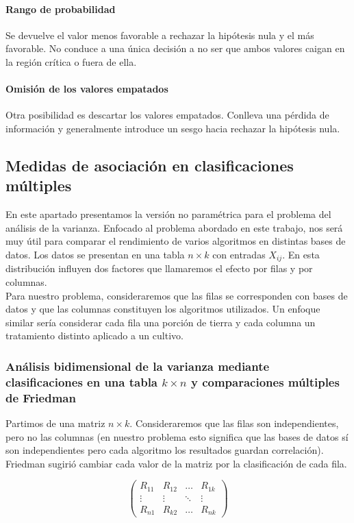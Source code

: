 \paragraph{Rango de probabilidad} Se devuelve el valor menos favorable a rechazar la hipótesis nula y el más favorable. No conduce a una única decisión a no ser que ambos valores caigan en la región crítica o fuera de ella.

\paragraph{Omisión de los valores empatados} Otra posibilidad es descartar los valores empatados. Conlleva una pérdida de información y generalmente introduce un sesgo hacia rechazar la hipótesis nula.

	
\subsection{Medidas de asociación en clasificaciones múltiples}	

	En este apartado presentamos la versión no paramétrica para el problema del análisis de la varianza. Enfocado al problema abordado en este trabajo, nos será muy útil para comparar el rendimiento de varios algoritmos en distintas bases de datos. Los datos se presentan en una tabla $n \times k$ con entradas $X_{ij}$. En esta distribución influyen dos factores que llamaremos el efecto por filas y por columnas.\\
	 Para nuestro problema, consideraremos que las filas se corresponden con bases de datos y que las columnas constituyen los algoritmos utilizados. Un enfoque similar sería considerar cada fila una porción de tierra y cada columna un tratamiento distinto aplicado a un cultivo.
	
\subsubsection{Análisis bidimensional de la varianza mediante clasificaciones en una tabla $k \times n$ y comparaciones múltiples de Friedman}

	Partimos de una matriz $n \times k$. Consideraremos que las filas son independientes, pero no las columnas (en nuestro problema esto significa que las bases de datos sí son independientes pero cada algoritmo los resultados guardan correlación). Friedman sugirió cambiar cada valor de la matriz por la clasificación de cada fila.
	
	\[ \left( \begin{matrix}
		R_{11} & R_{12} & \dots & R_{1k} \\
		\vdots & \vdots & \ddots & \vdots \\
		R_{n1} & R_{k2} & \dots & R_{nk}
		\end{matrix} \right)	\]

